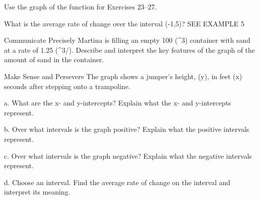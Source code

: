 \documentclass{article}
\newenvironment{practice}[2]{}{}        %
\newcommand{\answer}[1]{}               %
\newcommand{\placeholder}[2]{}          %
\begin{document}
\begin{practice}{27}{1}
Use the graph of the function for Exercises 23--27.

What is the average rate of change over the interval (-1,5)? SEE EXAMPLE 5
\answer{(-\frac{1}{2})}
\end{practice}

\begin{practice}{28}{3}
Communicate Precisely Martina is filling an empty 100 (^3) container with sand at a rate of 1.25 (^3/). Describe and interpret the key features of the graph of the amount of sand in the container.
\answer{The origin is the x and y intercept and informs you that the container is empty before it starts filling with sand. The domain is [0,80] which are the times when the container is filling with sand. The range is [0,100] which are the amounts of sand measured in cubic feet inside the container while it is filling.}
\end{practice}

\begin{practice}{29}{3}
Make Sense and Persevere The graph shows a jumper's height, (y), in feet (x) seconds after stepping onto a trampoline.

\placeholder{graph}{Green periodic height curve over a photo of two children on a trampoline. Horizontal axis Time (Seconds), ticks 0, 0.5, 1, 1.5, 2, 2.5; vertical axis Height (ft), ticks -0.5, 0, 0.5, 1, 1.5. Curve begins at (0,-0.5), reaches repeated peaks near (0.375,1.75), (1.125,1.75), and (1.875,1.75), with troughs near (0.75,-0.5), (1.5,-0.5), and (2.25,-0.5). Approximate x-intercepts from TE: 0.05, 0.7, 0.8, 1.45, 1.55, 2.2. Displayed curve ends near x=2.25; grid extends beyond 2.5. No coordinate pairs are printed on the graph.}

a. What are the x- and y-intercepts? Explain what the x- and y-intercepts represent.

b. Over what intervals is the graph positive? Explain what the positive intervals represent.

c. Over what intervals is the graph negative? Explain what the negative intervals represent.

d. Choose an interval. Find the average rate of change on the interval and interpret its meaning.
\answer{a. The x-intercepts are approximately 0.05, 0.7, 0.8, 1.45, 1.55, and 2.2. The x-intercepts represent the moment the jumper is at the height of the frame of the trampoline. The y-intercept is -0.5 and represents the sag of the trampoline when the jumper pushes down at the start of the first jump. b. (0.05,0.7), (0.8,1.45), and (1.55,2.2); The positive intervals represent the times when the jumper is above the frame of the trampoline. c. (0,0.05), (0.7,0.8), (1.45,1.55), and (2.2,2.25); The negative intervals represent the times when the jumper is below the frame of the trampoline. d. Sample answer [0.75,1.125]; 6 feet per second; The average rate of change over the interval [0.75,1.125] represents the average speed of the jumper on the upward part of a jump.}
\end{practice}
\end{document}
